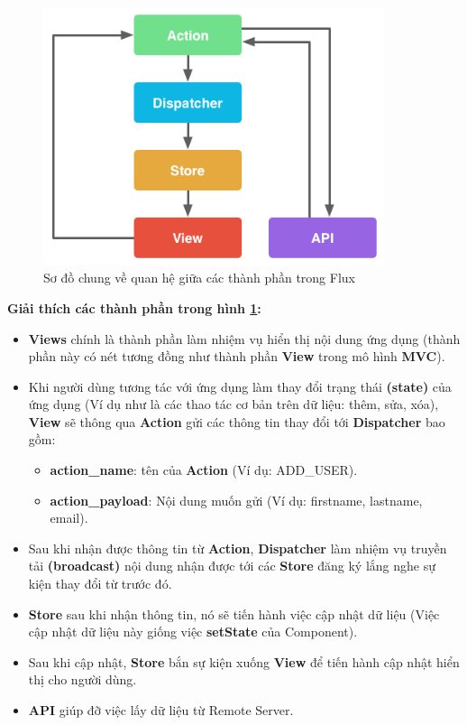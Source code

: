 \begin{figure}[H]
\centering
\includegraphics[width=10cm]{image/Redux-work-model.png}
\caption{Sơ đồ chung về quan hệ giữa các thành phần trong Flux}
\label{fig:redux_model}
\end{figure}
\textbf{Giải thích các thành phần trong hình \ref{fig:redux_model}:}
\begin{itemize}
    \item \textbf{Views} chính là thành phần làm nhiệm vụ hiển thị nội dung ứng dụng (thành phần này có nét tương đồng như thành phần \textbf{View} trong mô hình \textbf{MVC}).
    \item Khi người dùng tương tác với ứng dụng làm thay đổi trạng thái \textbf{(state)} của ứng dụng (Ví dụ như là các thao tác cơ bản trên dữ liệu: thêm, sửa, xóa), \textbf{View} sẽ thông qua \textbf{Action} gửi các thông tin thay đổi tới \textbf{Dispatcher} bao gồm:
    \begin{itemize}
        \item \textbf{action\_name}: tên của \textbf{Action} (Ví dụ: ADD\_USER).
        \item \textbf{action\_payload}: Nội dung muốn gửi (Ví dụ: firstname, lastname, email).
    \end{itemize}
    \item Sau khi nhận được thông tin từ \textbf{Action}, \textbf{Dispatcher} làm nhiệm vụ truyền tải \textbf{(broadcast)} nội dung nhận được tới các \textbf{Store} đăng ký lắng nghe sự kiện thay đổi từ trước đó.
    \item \textbf{Store} sau khi nhận thông tin, nó sẽ tiến hành việc cập nhật dữ liệu (Việc cập nhật dữ liệu này giống việc \textbf{setState} của Component).
    \item Sau khi cập nhật, \textbf{Store} bắn sự kiện xuống \textbf{View} để tiến hành cập nhật hiển thị cho người dùng.
    \item \textbf{API} giúp đỡ việc lấy dữ liệu từ Remote Server.
\end{itemize}



